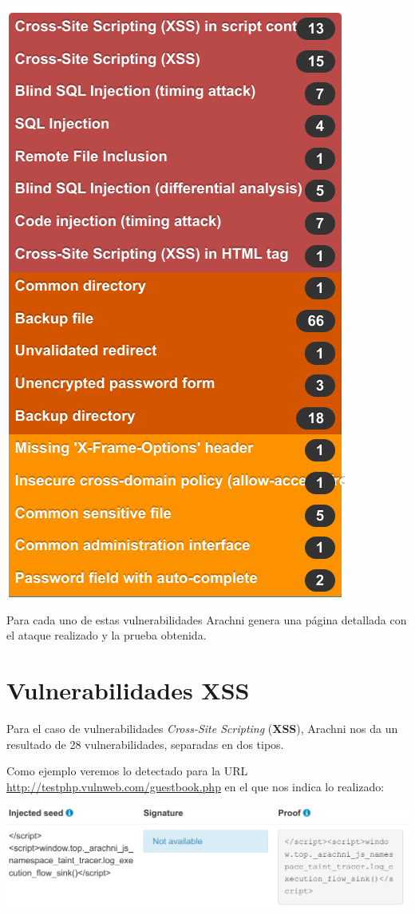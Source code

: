 \documentclass{\ClassPath/viu-tfm-template}
\begin{document}
\begin{center}
    \includegraphics[width=0.5\linewidth]{img/lista.png}
\end{center}
\vspace{-20pt}

Para cada uno de estas vulnerabilidades Arachni genera una página detallada con el ataque realizado y la prueba obtenida.

\hypertarget{vulnerabilidad_xss}{}
\chapter{Vulnerabilidades XSS}
Para el caso de vulnerabilidades \textit{Cross-Site Scripting} (\textbf{XSS}), Arachni nos da un resultado de 28 vulnerabilidades, separadas en dos tipos.

Como ejemplo veremos lo detectado para la URL \href{http://testphp.vulnweb.com/guestbook.php}{http://testphp.vulnweb.com/guestbook.php} en el que nos indica lo realizado:

\begin{center}
    \vspace{-20pt}
    \includegraphics[frame,width=0.9\linewidth]{img/informe_xss.png}
\end{center}
\end{document}
